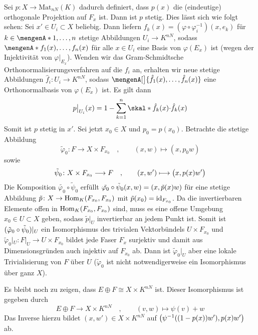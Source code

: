 \begin{beweis}
Sei $p \colon X \to \mathrm{Mat}_{nN}(K)$ dadurch definiert, dass $p(x)$ die (eindeutige) orthogonale Projektion auf $F_x$ ist. Dann ist $p$ stetig. Dies lässt sich wie 
folgt sehen: Sei $x' \in U_i \subset X$ beliebig. Dann liefern $f_k(x)=(\varphi \circ \varphi_i ^{-1})(x,e_k)$ für $k \in \set{1, \ldots ,n}$ stetige Abbildungen 
$U_i \to K^{nN}$, sodass $\set{f_1(x), \ldots , f_n(x)}$ für alle $x \in U_i$ eine Basis von $\varphi(E_x)$ ist (wegen der Injektivität von $\varphi|_{E_x}$). Wenden wir das
Gram-Schmidtsche Orthonormalisierungsverfahren auf die $f_i$ an, erhalten wir neue stetige Abbildungen $\hat{f}_i \colon U_i \to K^{nN}$, sodass 
$\mengenA[\big]{\hat{f}_1(x), \ldots , \hat{f}_n(x)}$ eine Orthonormalbasis von $\varphi(E_x)$ ist. Es gilt dann
\[
	p\big|_{U_i}(x) = 1 - \sum_{k=1}^{n} \skal*{\hat{f}_k(x)}{\cdot } \hat{f}_k(x)
\]
Somit ist $p$ stetig in $x'$. Sei jetzt $x_0 \in X$ und $p_0=p(x_0)$. Betrachte die stetige Abbildung
\[
	\tilde{\varphi}_0 \colon F \longrightarrow X \times F_{x_0} \quad , \qquad (x,w) \longmapsto (x,p_0 w)
\]
sowie
\[
	\tilde{\psi}_0 \colon X \times F_{x_0} \longrightarrow F \quad ,\qquad (x,w') \longmapsto \enbrace[\big]{x,p(x) w'}
\] 
Die Komposition $\tilde{\varphi_0} \circ \tilde{\psi}_0$ erfüllt $\tilde{\varphi_0} \circ \tilde{\psi}_0(x,w) = \enbrace*{x,\tilde{p}(x) w}$ für eine stetige Abbildung 
$\tilde{p} \colon X \to \Hom_K(F_{x_0}, F_{x_0})$ mit $\tilde{p}(x_0)=\id_{F_{x_0}}$. Da die invertierbaren Elemente offen in $\Hom_K(F_{x_0},F_{x_0})$ sind, muss es eine 
offene Umgebung $x_0 \in U \subset X$ geben, sodass $\tilde{p}|_U$ invertierbar an jedem Punkt ist. Somit ist $\enbrace{\tilde{\varphi}_0 \circ \tilde{\psi}_0}|_U$ ein 
Isomorphismus des trivialen Vektorbündels $U \times F_{x_0}$ und $\tilde{\varphi}_0|_U \colon F|_U \to U \times F_{x_0}$ bildet jede Faser $F_x$ surjektiv und damit aus 
Dimensionsgründen auch injektiv auf $F_{x_0}$ ab. Dann ist $\tilde{\varphi}_0|_U$ aber eine lokale Trivialisierung von $F$ über $U$ ($\tilde{\varphi}_0$ ist nicht 
notwendigerweise ein Isomorphismus über ganz $X$).

Es bleibt noch zu zeigen, dass $E \oplus F \cong X \times K^{nN}$ ist. Dieser Isomorphismus ist gegeben durch 
\[
	E \oplus F \longrightarrow X \times K^{nN} \quad , \qquad (v,w) \longmapsto \psi(v) + w
\]
Das Inverse hierzu bildet $(x,w') \in X \times K^{nN}$ auf $\enbrace*{\psi ^{-1} \enbrace*{ (1- p(x)) w'}, p(x)w'}$ ab.
\end{beweis}

